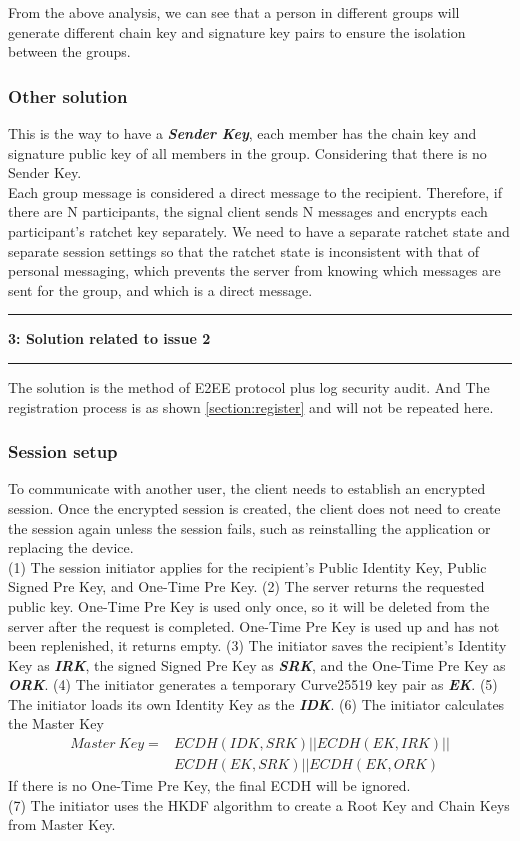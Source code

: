 \documentclass[11pt]{article}
\newcommand\question[2]{\vspace{.25in}\hrule\textbf{#1: #2}\vspace{.5em}\hrule\vspace{.10in}}
\begin{document}
From the above analysis, we can see that a person in different groups will generate different chain key and signature key pairs to ensure the isolation between the groups.


\subsubsection{Other solution}
This is the way to have a \textbf{\emph{Sender Key}}, each member has the chain key and signature public key of all members in the group.
Considering that there is no Sender Key.\\

Each group message is considered a direct message to the recipient. Therefore, if there are N participants, the signal client sends N messages and encrypts each participant's ratchet key separately. We need to have a separate ratchet state and separate session settings so that the ratchet state is inconsistent with that of personal messaging, which prevents the server from knowing which messages are sent for the group, and which is a direct message.

\question{3}{Solution related to issue 2}
The solution is the method of E2EE protocol plus log security audit. And The registration process is as shown \ref{section:register} and will not be repeated here.

\subsubsection{Session setup}
To communicate with another user, the client needs to establish an encrypted session. 
Once the encrypted session is created, the client does not need to create the session again unless the session fails, such as reinstalling the application or replacing the device.\\
(1) The session initiator applies for the recipient's Public Identity Key, Public Signed Pre Key, and One-Time Pre Key.
(2) The server returns the requested public key. 
One-Time Pre Key is used only once, so it will be deleted from the server after the request is completed. 
One-Time Pre Key is used up and has not been replenished, it returns empty.
(3) The initiator saves the recipient's Identity Key as \textbf{\emph{IRK}}, the signed Signed Pre Key as \textbf{\emph{SRK}}, and the One-Time Pre Key as \textbf{\emph{ORK}}.
(4) The initiator generates a temporary Curve25519 key pair as \textbf{\emph{EK}}.
(5) The initiator loads its own Identity Key as the \textbf{\emph{IDK}}.
(6) The initiator calculates the Master Key
\begin{equation}
\begin{split}
Master\ Key =& ECDH ( IDK, SRK) || ECDH(EK, IRK) || \\
    &ECDH ( EK, SRK)|| ECDH ( EK, ORK)
\end{split}
\end{equation}
If there is no One-Time Pre Key, the final ECDH will be ignored.\\
(7) The initiator uses the HKDF algorithm to create a Root Key and Chain Keys from Master Key.
\end{document}
